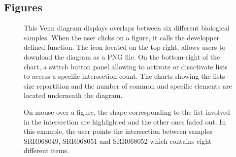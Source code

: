 \documentclass{bmcart}
\begin{document}
\begin{backmatter}

\section*{Figures}
  \begin{figure}[h!]
  \caption{
      This Venn diagram displays overlaps between six different biological samples. When 
      the user clicks on a figure, it calls the developper defined function. 
      The icon located on the top-right, allows users to download the diagram as a PNG 
      file. On the bottom-right of the chart, a switch button panel allowing to activate or 
      disactivate lists to access a specific intersection count. The charts showing the lists 
      size repartition and the number of common and specific elements are located underneath the
      diagram.}
      \end{figure}

\begin{figure}[h!]
  \caption{
      On mouse over a figure, the shape corresponding to the list involved in the intersection
      are highlighted and the other ones faded out. In this example, the user points the
      intersection between samples SRR068049, SRR068051 and SRR068052 which contains eight 
      different items.}
      \end{figure}



\end{backmatter}
\end{document}
